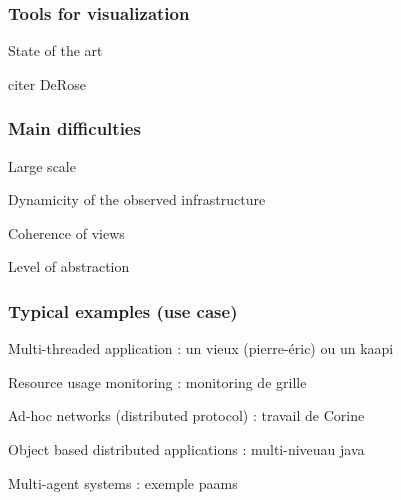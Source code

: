 \begin{frame}
\frametitle{Tools for visualization}
State of the art

citer DeRose
\end{frame}

\begin{frame}
\frametitle{Main difficulties}
\begin{description}
\item Large scale
\item Dynamicity of the observed infrastructure
\item Coherence of views
\item Level of abstraction
\end{description}
\end{frame}

\begin{frame}
\frametitle{Typical examples (use case)}
\begin{description}
\item Multi-threaded application : un vieux (pierre-éric) ou un kaapi 
\item Resource usage monitoring : monitoring de grille 
\item Ad-hoc networks (distributed protocol) : travail de Corine
\item 
\item Object based distributed applications : multi-niveuau java
\item Multi-agent systems : exemple paams
\end{description}
\end{frame}
